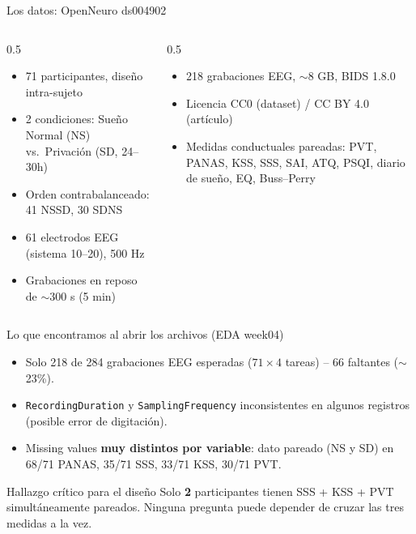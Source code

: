 \documentclass[10pt,aspectratio=169]{beamer}
\begin{document}
\begin{frame}{Los datos: OpenNeuro ds004902}
\begin{columns}[T]
\begin{column}{0.5\textwidth}
\begin{itemize}
    \item 71 participantes, diseño intra-sujeto
    \item 2 condiciones: Sueño Normal (NS) vs.\ Privación (SD, 24--30h)
    \item Orden contrabalanceado: 41 NS\textrightarrow SD, 30 SD\textrightarrow NS
    \item 61 electrodos EEG (sistema 10--20), 500 Hz
    \item Grabaciones en reposo de $\sim$300 s (5 min)
\end{itemize}
\end{column}
\begin{column}{0.5\textwidth}
\begin{itemize}
    \item 218 grabaciones EEG, $\sim$8 GB, BIDS 1.8.0
    \item Licencia CC0 (dataset) / CC BY 4.0 (artículo)
    \item Medidas conductuales pareadas: PVT, PANAS, KSS, SSS, SAI, ATQ, PSQI, diario de sueño, EQ, Buss--Perry
\end{itemize}
\end{column}
\end{columns}
\end{frame}

\begin{frame}{Lo que encontramos al abrir los archivos (EDA week04)}
\begin{itemize}
    \item Solo 218 de 284 grabaciones EEG esperadas ($71\times4$ tareas) -- 66 faltantes ($\sim$23\%).
    \item \texttt{RecordingDuration} y \texttt{SamplingFrequency} inconsistentes en algunos registros (posible error de digitación).
    \item Missing values \textbf{muy distintos por variable}: dato pareado (NS y SD) en 68/71 PANAS, 35/71 SSS, 33/71 KSS, 30/71 PVT.
\end{itemize}
\begin{alertblock}{Hallazgo crítico para el diseño}
Solo \textbf{2} participantes tienen SSS + KSS + PVT simultáneamente pareados. Ninguna pregunta puede depender de cruzar las tres medidas a la vez.
\end{alertblock}
\end{frame}
\end{document}
